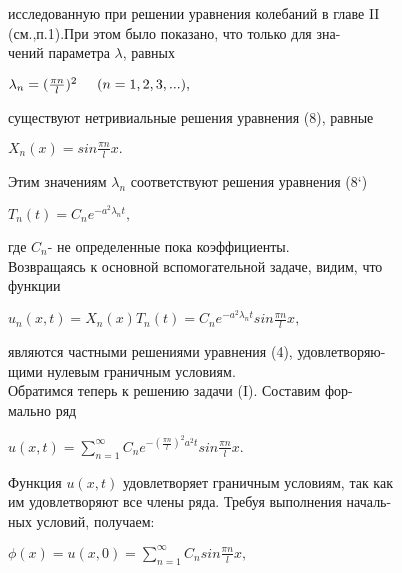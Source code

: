 \documentclass[12pt]{article}
\begin{document}
\textnormal{исследованную при решении уравнения колебаний в главе II\\ (см.,п.1).При этом было показано, что только для зна-\\чений параметра $\lambda$, равных }

\begin{center}
$\lambda_n=(\frac{\pi n}{l})^2\hspace{0.5cm}(n=1,2,3,...),$
\end{center}

\textnormal{существуют нетривиальные решения уравнения (8), равные }

\begin{center}
$X_n(x)=sin\frac{\pi n}{l}x.$
\end{center}

\textnormal{Этим значениям $\lambda_n$ соответствуют решения уравнения (8`)}

\begin{center}
$T_n(t)=C_ne^{-a^2\lambda_n t},$
\end{center}

\textnormal{где $C_n$- не определенные пока коэффициенты.\\ \hspace{0.5cm} Возвращаясь к основной вспомогательной задаче, видим, что \\ функции}

\begin{center}
$u_n(x,t)=X_n(x)T_n(t)=C_ne^{-a^2\lambda_n t}sin\frac{\pi n}{l}x,$
\end{center}

\textnormal{являются частными решениями уравнения (4), удовлетворяю-\\щими нулевым граничным условиям.\\ \hspace{0.5cm}Обратимся теперь к решению задачи (I). Составим фор-\\мально ряд}

\begin{center}
$u(x,t)=\displaystyle\sum_{n=1}^{\infty}C_ne^{-(\frac{\pi n}{l})^2a^2t}sin\frac{\pi n}{l}x.$
\end{center}

\textnormal{Функция $u(x,t)$ удовлетворяет граничным условиям, так как \\ им удовлетворяют все члены ряда. Требуя выполнения началь-\\ных условий, получаем:}

\begin{center}
$\phi(x)=u(x,0)=\displaystyle\sum_{n=1}^{\infty}C_nsin\frac{\pi n}{l}x,$   
\end{center}
\end{document}
